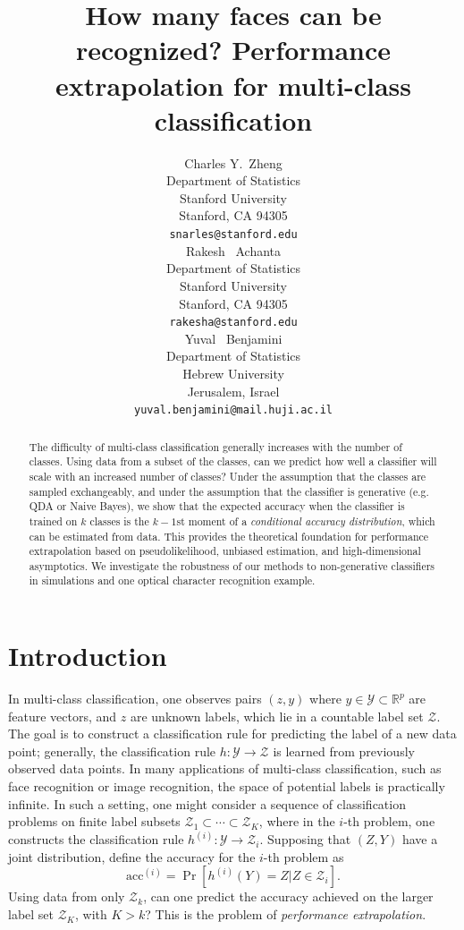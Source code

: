 \documentclass{article}
\title{How many faces can be recognized? Performance extrapolation for
  multi-class classification}
\author{
  Charles Y.~Zheng \\
  Department of Statistics\\
  Stanford University\\
  Stanford, CA 94305 \\
  \texttt{snarles@stanford.edu} \\
  \And
  Rakesh ~Achanta \\
  Department of Statistics\\
  Stanford University\\
  Stanford, CA 94305 \\
  \texttt{rakesha@stanford.edu} \\
  \And
  Yuval ~Benjamini \\
  Department of Statistics \\
  Hebrew University\\
  Jerusalem, Israel\\
  \texttt{yuval.benjamini@mail.huji.ac.il}
}
\begin{document}

\maketitle

\begin{abstract}
The difficulty of multi-class classification generally increases with
the number of classes.  Using data from a subset of the classes, 
can we predict how well a classifier will scale with an
increased number of classes?  Under the assumption that the classes
are sampled exchangeably, and under the assumption that
the classifier is generative (e.g. QDA or Naive Bayes), we show that the expected accuracy
when the classifier is trained on $k$ classes is the $k-1$st moment
of a \emph{conditional accuracy distribution}, which can be estimated from data.
This provides the theoretical foundation for performance extrapolation based on pseudolikelihood, 
unbiased estimation, and high-dimensional asymptotics.
We investigate the robustness of our methods to non-generative classifiers
in simulations and one optical character recognition example.
\end{abstract}

\section{Introduction}

In multi-class classification, one observes pairs $(z, y)$ where $y \in \mathcal{Y} \subset \mathbb{R}^p$ are feature vectors,
and $z$ are unknown labels, which lie in a countable label set $\mathcal{Z}$.  The goal is to construct a classification rule for
predicting the label of a new data point; generally, the classification rule $h: \mathcal{Y} \to \mathcal{Z}$
is learned from previously observed data points.  In many applications of multi-class classification,
such as face recognition or image recognition, the space of potential labels is practically infinite.
In such a setting, one might consider a sequence of classification problems on finite label subsets $\mathcal{Z}_1 \subset \cdots \subset \mathcal{Z}_K$, where in the $i$-th problem, one constructs the classification rule $h^{(i)}:\mathcal{Y} \to \mathcal{Z}_i$.
Supposing that $(Z, Y)$ have a joint distribution, define the accuracy for the $i$-th problem as
\[
\text{acc}^{(i)} = \Pr[h^{(i)}(Y) = Z|Z \in \mathcal{Z}_i].
\]
Using data from only $\mathcal{Z}_k$, can one predict the accuracy achieved on the larger label set $\mathcal{Z}_K$, with $K> k$?  This is the problem of \emph{performance extrapolation}.
\end{document}
